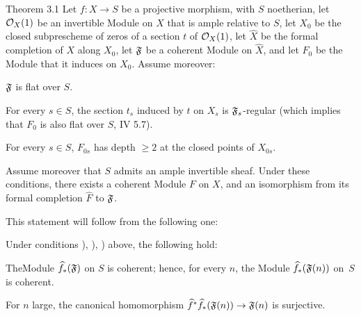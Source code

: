 \setcounter{equation}{16}%
\label{XII.3.1}%
\begin{enonce*}{Theorem 3.1\ndemark}
Let $f:X\to S$ be a projective morphism, with $S$ noetherian, let $\mathcal O_X(1)$ be an invertible Module on $X$ that is ample relative to $S$, let $X_0$ be the closed subprescheme of zeros of a section $t$ of $\mathcal O_X(1)$, let $\widehat{X}$ be the formal completion of $X$ along $X_0$, let $\mathfrak F$ be a coherent Module on $\widehat{X}$, and let $F_0$ be the Module that it induces on $X_0$. Assume moreover:
\begin{enumeratea}
\item\label{XII.3.1a}
$\mathfrak F$ is flat over $S$.
\item\label{XII.3.1b}
For every $s\in S$, the section $t_s$ induced by $t$ on $X_s$ is $\mathfrak F_s$-regular (which implies that $F_0$ is also flat over $S$, \cf \textup{ IV 5.7}).
\item\label{XII.3.1c}
For every $s\in S$, $F_{0s}$ has depth $\geq 2$ at the closed points of $X_{0s}$.
\end{enumeratea}
Assume moreover that $S$ admits an ample invertible sheaf. Under these conditions, there exists a coherent Module $F$ on $X$, and an isomorphism from its formal completion $\widehat{F}$ to $\mathfrak F$.
\end{enonce*}

This statement will follow from the following one:

\begin{corollaire} \label{XII.3.2}
Under conditions ), ), ) above, the following hold:
\begin{enumeratei}
\item
The\pageoriginale Module $\widehat{f}_\ast(\mathfrak F)$ on $S$ is coherent; hence, for every $n$, the Module $\widehat{f}_\ast(\mathfrak F(n))$ on~$S$ is coherent.
\item
For $n$ large, the canonical homomorphism $\widehat{f}^\ast\widehat{f}_\ast(\mathfrak F(n))\to \mathfrak F(n)$ is surjective.
\end{enumeratei}
\end{corollaire}

